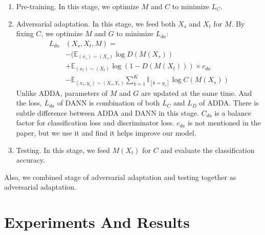 \documentclass[conference]{IEEEtran}
\begin{document}
\begin{enumerate}
  \item Pre-training. In this stage, we optimize $M$ and $C$ to minimize $L_{C}$.
  \item Adversarial adaptation. In this stage, we feed both $X_s$ and $X_t$ for $M$. By fixing $C$, we optimize $M$ and $G$ to minimize $L_{da}$:
      \begin{equation}\label{dann_da}
        \begin{aligned}
        L_{da} & (X_{s}, X_{t}, M) =  \\
                            &-(\mathbb{E}_{(x_s) \sim (X_s)} \log D(M(X_{s})) \\
                            &+\mathbb{E}_{(x_t) \sim (X_t)} \log (1 - D(M(X_{t}))) \times c_{da} \\
                            &-\mathbb{E}_{(x_s,y_s) \sim (X_s,Y_s)}
                            \sum\limits_{k=1}^{K} \mathbb{I}_{[k=y_s]} \log C(M(X_{s}))
        \end{aligned}
      \end{equation}
      Unlike ADDA, parameters of $M$ and $G$ are updated at the same time. And the loss, $L_{da}$ of DANN is combination of both $L_C$ and $L_D$ of ADDA. There is subtle difference between ADDA and DANN in this stage. $C_{da}$ is a balance factor for classification loss and discriminator loss. $c_{da}$ is not mentioned in the paper, but we use it and find it helps improve our model.
  \item Testing. In this stage, we feed $M(X_t)$ for $C$ and evaluate the classification accuracy.
\end{enumerate}
Also, we combined stage of adversarial adaptation and testing together as adversarial adaptation.

\section{Experiments And Results}
\end{document}
